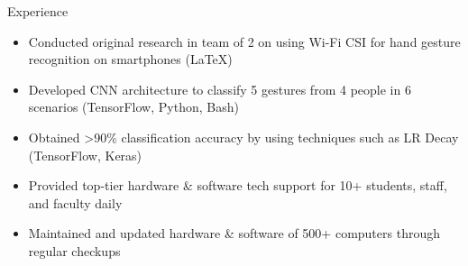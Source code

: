\documentclass{resume} %
\begin{document}
\begin{workSection}{Experience}
    \experienceItem[
    company=Temple University,
    location=Philadelphia{,} PA,
    position=Undergraduate Researcher,
    duration=June – July 2023
    ]
    \begin{itemize}
        \itemsep -6pt {}
        \item Conducted original research in team of 2 on using Wi-Fi CSI for hand gesture recognition on smartphones (LaTeX)
        \item Developed CNN architecture to classify 5 gestures from 4 people in 6 scenarios (TensorFlow, Python, Bash)
        \item Obtained >90\% classification accuracy by using techniques such as LR Decay (TensorFlow, Keras)
    \end{itemize}

    \experienceItem[
    company=UTEP,
    location=El Paso{,} TX,
    position=Computer Lab Assistant,
    duration=January {-} May 2023
    ]
    \begin{itemize}
        \itemsep -6pt {}
        \item Provided top-tier hardware \& software tech support for 10+ students, staff, and faculty daily
        \item Maintained and updated hardware \& software of 500+ computers through regular checkups
    \end{itemize}

\end{workSection}
\end{document}
